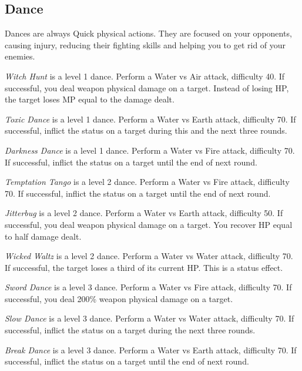 \label{sec:performances}
\begin{multicols}{2}

    \subsection{Dance}\label{subsec:perf-dance}
    
    Dances are always Quick physical actions. They are focused on your opponents, causing injury, reducing their fighting skills and helping you to get rid of your enemies.
    
    \textit{Witch Hunt} is a level 1 dance. Perform a Water vs Air attack, difficulty 40. If successful, you deal weapon physical damage on a target. Instead of losing HP, the target loses MP equal to the damage dealt.
    
    \textit{Toxic Dance} is a level 1 dance. Perform a Water vs Earth attack, difficulty 70. If successful, inflict the  status on a target during this and the next three rounds.

    \textit{Darkness Dance} is a level 1 dance. Perform a Water vs Fire attack, difficulty 70. If successful, inflict the  status on a target until the end of next round.
    
    \textit{Temptation Tango} is a level 2 dance. Perform a Water vs Fire attack, difficulty 70. If successful, inflict the  status on a target until the end of next round.
    
    \textit{Jitterbug} is a level 2 dance. Perform a Water vs Earth attack, difficulty 50. If successful, you deal weapon physical damage on a target. You recover HP equal to half damage dealt.
    
    \textit{Wicked Waltz} is a level 2 dance. Perform a Water vs Water attack, difficulty 70. If successful, the target loses a third of its current HP. This is a  status effect.
    
    \textit{Sword Dance} is a level 3 dance. Perform a Water vs Fire attack, difficulty 70. If successful, you deal 200\% weapon physical damage on a target.
    
    \textit{Slow Dance} is a level 3 dance. Perform a Water vs Water attack, difficulty 70. If successful, inflict the  status on a target during the next three rounds.
    
    \textit{Break Dance} is a level 3 dance. Perform a Water vs Earth attack, difficulty 70. If successful, inflict the  status on a target until the end of next round.
    

\end{multicols}

